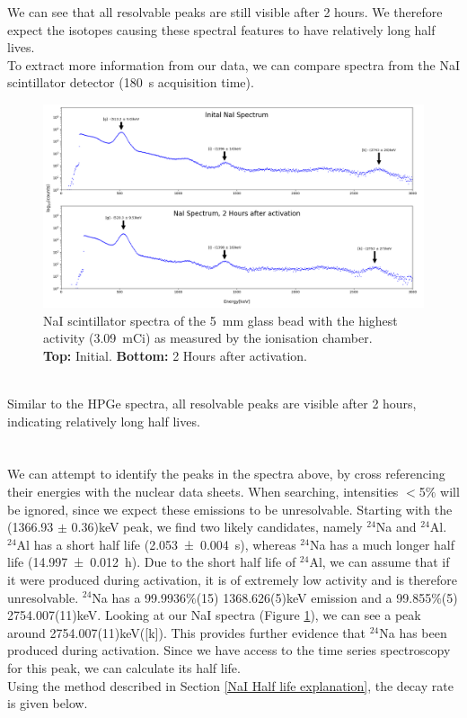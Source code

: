 \documentclass[]{article}
\begin{document}
We can see that all resolvable peaks are still visible after 2 hours. We therefore expect the isotopes causing these spectral features to have relatively long half lives.\pagebreak \\ To extract more information from our data, we can compare spectra from the NaI scintillator detector (\SI{180}{\second} acquisition time). 
\begin{figure}[h!]
	\includegraphics[scale = 0.42]{NaISpectrum.png}
	\centering
	\captionsetup{justification=centering,margin=2cm}
	\caption{NaI scintillator spectra of the \SI{5}{\milli \metre} glass bead with the highest activity (\SI{3.09}{\milli Ci}) as measured by the ionisation chamber. \\ \textbf{Top:} Initial.  \textbf{Bottom:} 2 Hours after activation. }
	\label{fig:NaI_spectra}
\end{figure}~\\
Similar to the HPGe spectra, all resolvable peaks are visible after 2 hours, indicating relatively long half lives.\\\\
~\\
We can attempt to identify the peaks in the spectra above, by cross referencing their energies with the nuclear data sheets\cite{nudat}. When searching, intensities $<$5$\%$ will be ignored, since we expect these emissions to be unresolvable. Starting with the (1366.93 $\pm$ 0.36)keV peak, we find two likely candidates, namely ${}^{24}$Na and ${}^{24}$Al. ${}^{24}$Al has a short half life (\SI{2.053(4)}{\second}), whereas ${}^{24}$Na has a much longer half life (\SI{14.997(12)}{\hour}). Due to the short half life of ${}^{24}$Al, we can assume that if it were produced during activation, it is of extremely low activity and is therefore unresolvable. ${}^{24}$Na has a 99.9936$\%$(15) 1368.626(5)keV emission and a 99.855$\%$(5) 2754.007(11)keV. Looking at our NaI spectra (Figure \ref{fig:NaI_spectra}), we can see a peak around 2754.007(11)keV([k]). This provides further evidence that ${}^{24}$Na has been produced during activation. Since we have access to the time series spectroscopy for this peak, we can calculate its half life.\pagebreak \\ Using the method described in Section \ref{NaI Half life explanation}, the decay rate is given below.
\end{document}
